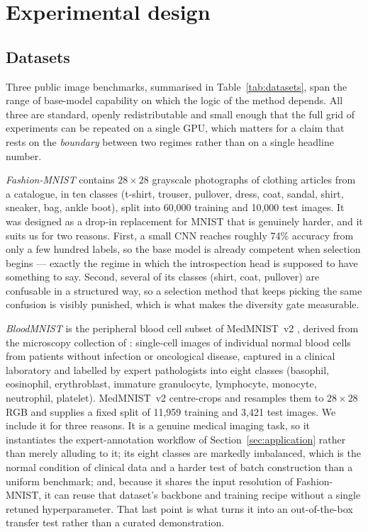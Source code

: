 \documentclass[a4paper,fleqn,longmktitle]{cas-sc}
\begin{document}
\section{Experimental design}\label{sec:experiments}

\subsection{Datasets}\label{sec:datasets}
Three public image benchmarks, summarised in
Table~\ref{tab:datasets}, span the range of base-model capability on
which the logic of the method depends. All three are standard,
openly redistributable and small enough that the full grid of
experiments can be repeated on a single GPU, which matters for a
claim that rests on the \emph{boundary} between two regimes rather
than on a single headline number.

\emph{Fashion-MNIST} \citep{xiao2017} contains $28\times28$ grayscale
photographs of clothing articles from a catalogue, in ten classes
(t-shirt, trouser, pullover, dress, coat, sandal, shirt, sneaker, bag,
ankle boot), split into 60,000 training and 10,000 test images. It was
designed as a drop-in replacement for MNIST that is genuinely harder,
and it suits us for two reasons. First, a small CNN reaches roughly
74\% accuracy from only a few hundred labels, so the base model is
already competent when selection begins --- exactly the regime in
which the introspection head is supposed to have something to say.
Second, several of its classes (shirt, coat, pullover) are confusable
in a structured way, so a selection method that keeps picking the same
confusion is visibly punished, which is what makes the diversity gate
measurable.

\emph{BloodMNIST} is the peripheral blood cell subset of MedMNIST~v2
\citep{yang2023}, derived from the microscopy collection of
\citet{acevedo2020}: single-cell images of individual normal blood
cells from patients without infection or oncological disease, captured
in a clinical laboratory and labelled by expert pathologists into eight
classes (basophil, eosinophil, erythroblast, immature granulocyte,
lymphocyte, monocyte, neutrophil, platelet). MedMNIST~v2 centre-crops
and resamples them to $28\times28$ RGB and supplies a fixed split of
11,959 training and 3,421 test images. We include it for three
reasons. It is a genuine medical imaging task, so it instantiates the
expert-annotation workflow of Section~\ref{sec:application} rather than
merely alluding to it; its eight classes are markedly imbalanced, which
is the normal condition of clinical data and a harder test of batch
construction than a uniform benchmark; and, because it shares the input
resolution of Fashion-MNIST, it can reuse that dataset's backbone and
training recipe without a single retuned hyperparameter. That last
point is what turns it into an out-of-the-box transfer test rather than
a curated demonstration.
\end{document}
